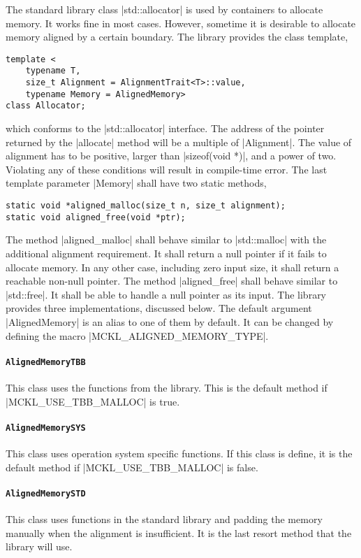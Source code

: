 The standard library class |std::allocator| is used by containers to allocate
memory. It works fine in most cases. However, sometime it is desirable to
allocate memory aligned by a certain boundary. The library provides the class
template,
\begin{Verbatim}
template <
    typename T,
    size_t Alignment = AlignmentTrait<T>::value,
    typename Memory = AlignedMemory>
class Allocator;
\end{Verbatim}
which conforms to the |std::allocator| interface. The address of the pointer
returned by the |allocate| method will be a multiple of |Alignment|. The value
of alignment has to be positive, larger than |sizeof(void *)|, and a power of
two. Violating any of these conditions will result in compile-time error. The
last template parameter |Memory| shall have two static methods,
\begin{Verbatim}
static void *aligned_malloc(size_t n, size_t alignment);
static void aligned_free(void *ptr);
\end{Verbatim}
The method |aligned_malloc| shall behave similar to |std::malloc| with the
additional alignment requirement. It shall return a null pointer if it fails to
allocate memory. In any other case, including zero input size, it shall return
a reachable non-null pointer. The method |aligned_free| shall behave similar to
|std::free|. It shall be able to handle a null pointer as its input. The
library provides three implementations, discussed below. The default argument
|AlignedMemory| is an alias to one of them by default. It can be changed by
defining the macro |MCKL_ALIGNED_MEMORY_TYPE|.

\paragraph{\texttt{AlignedMemoryTBB}} This class uses the functions from the
\tbb library. This is the default method if |MCKL_USE_TBB_MALLOC| is true.

\paragraph{\texttt{AlignedMemorySYS}} This class uses operation system specific
functions. If this class is define, it is the default method if
|MCKL_USE_TBB_MALLOC| is false.

\paragraph{\texttt{AlignedMemorySTD}} This class uses functions in the standard
library and padding the memory manually when the alignment is insufficient. It
is the last resort method that the library will use.

